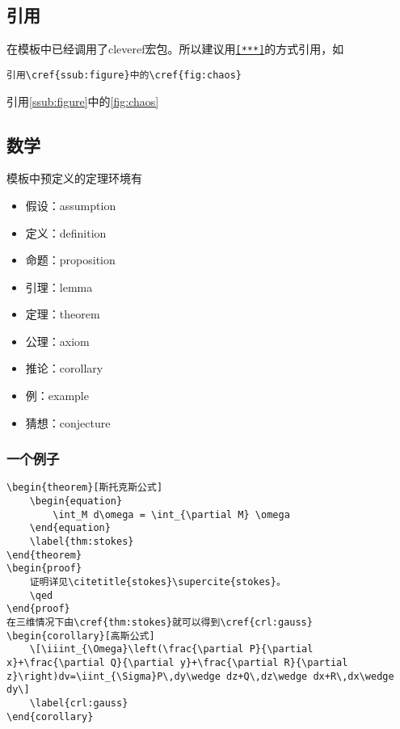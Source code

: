 \documentclass[oneside]{LZU}
\newcommand{\package}[1]{{\sffamily #1}}
\begin{document}
\subsection{引用}
在模板中已经调用了\package{cleveref}宏包。所以建议用\texttt{\cref{***}}的方式引用，如
\begin{verbatim}
引用\cref{ssub:figure}中的\cref{fig:chaos}
\end{verbatim}
引用\cref{ssub:figure}中的\cref{fig:chaos}
\subsection{数学}
模板中预定义的定理环境有
\begin{itemize}
    \item 假设：assumption
    \item 定义：definition
    \item 命题：proposition
    \item 引理：lemma
    \item 定理：theorem
    \item 公理：axiom
    \item 推论：corollary
    \item 例：example
    \item 猜想：conjecture
\end{itemize}
\subsubsection{一个例子}
\begin{verbatim}
\begin{theorem}[斯托克斯公式]
    \begin{equation}
        \int_M d\omega = \int_{\partial M} \omega
    \end{equation}
    \label{thm:stokes}
\end{theorem}
\begin{proof}
    证明详见\citetitle{stokes}\supercite{stokes}。
    \qed
\end{proof}
在三维情况下由\cref{thm:stokes}就可以得到\cref{crl:gauss}
\begin{corollary}[高斯公式]
    \[\iiint_{\Omega}\left(\frac{\partial P}{\partial x}+\frac{\partial Q}{\partial y}+\frac{\partial R}{\partial z}\right)dv=\iint_{\Sigma}P\,dy\wedge dz+Q\,dz\wedge dx+R\,dx\wedge dy\]
    \label{crl:gauss}
\end{corollary}
\end{verbatim}
\end{document}
